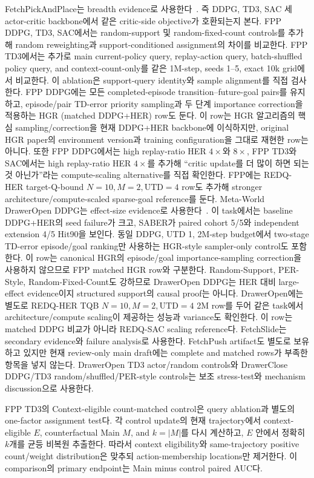 \documentclass[letterpaper]{article}
\begin{document}
FetchPickAndPlace는 breadth evidence로 사용한다~\citep{plappert2018multigoal}. 즉 DDPG, TD3, SAC 세 actor-critic backbone에서 같은 critic-side objective가 호환되는지 본다. FPP DDPG, TD3, SAC에서는 random-support 및 random-fixed-count controls를 추가해 random reweighting과 support-conditioned assignment의 차이를 비교한다. FPP TD3에서는 추가로 main current-policy query, replay-action query, batch-shuffled policy query, and context-count-only를 같은 1M-step, seeds 1--5, exact 10k grid에서 비교한다. 이 ablation은 support-query identity와 sample alignment를 직접 검사한다. FPP DDPG에는 모든 completed-episode transition--future-goal pairs를 유지하고, episode/pair TD-error priority sampling과 두 단계 importance correction을 적용하는 HGR (matched DDPG+HER) row도 둔다. 이 row는 HGR 알고리즘의 핵심 sampling/correction을 현재 DDPG+HER backbone에 이식하지만, original HGR paper의 environment version과 training configuration을 그대로 재현한 row는 아니다. 또한 FPP DDPG에서는 high replay-ratio HER \(4\times\)와 \(8\times\), FPP TD3와 SAC에서는 high replay-ratio HER \(4\times\)를 추가해 ``critic update를 더 많이 하면 되는 것 아닌가''라는 compute-scaling alternative를 직접 확인한다. FPP에는 REDQ-HER target-Q-bound \(N=10,M=2,\mathrm{UTD}=4\) row도 추가해 stronger architecture/compute-scaled sparse-goal reference를 둔다. Meta-World DrawerOpen DDPG는 effect-size evidence로 사용한다~\citep{yu2020metaworld}. 이 task에서는 baseline DDPG+HER의 seed failure가 크고, SABER가 paired cohort 5/5와 independent extension 4/5 Hit90을 보인다. 동일 DDPG, UTD 1, 2M-step budget에서 two-stage TD-error episode/goal ranking만 사용하는 HGR-style sampler-only control도 포함한다. 이 row는 canonical HGR의 episode/goal importance-sampling correction을 사용하지 않으므로 FPP matched HGR row와 구분한다. Random-Support, PER-Style, Random-Fixed-Count도 강하므로 DrawerOpen DDPG는 HER 대비 large-effect evidence이지 structured support의 causal proof는 아니다. DrawerOpen에는 별도로 REDQ-HER TQB \(N=10,M=2,\mathrm{UTD}=4\) 2M row를 두어 같은 task에서 architecture/compute scaling이 제공하는 성능과 variance도 확인한다. 이 row는 matched DDPG 비교가 아니라 REDQ-SAC scaling reference다. FetchSlide는 secondary evidence와 failure analysis로 사용한다. FetchPush artifact도 별도로 보유하고 있지만 현재 review-only main draft에는 complete and matched rows가 부족한 항목을 넣지 않는다. DrawerOpen TD3 actor/random controls와 DrawerClose DDPG/TD3 random/shuffled/PER-style controls는 보조 stress-test와 mechanism discussion으로 사용한다.

FPP TD3의 Context-eligible count-matched control은 query ablation과 별도의 one-factor assignment test다. 각 control update의 현재 trajectory에서 context-eligible \(E\), counterfactual Main \(M\), and \(k=|M|\)를 다시 계산하고, \(E\) 안에서 정확히 \(k\)개를 균등 비복원 추출한다. 따라서 context eligibility와 same-trajectory positive count/weight distribution은 맞추되 action-membership locations만 제거한다. 이 comparison의 primary endpoint는 Main minus control paired AUC다.
\end{document}
